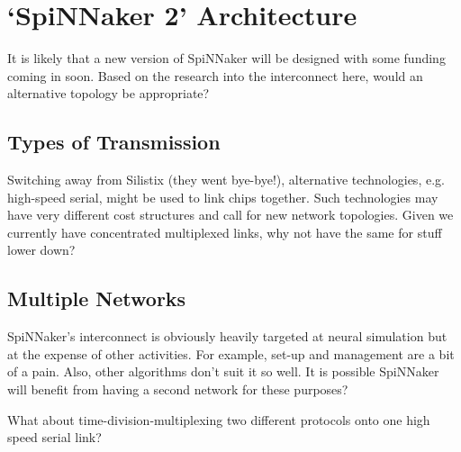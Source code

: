 	\section{`SpiNNaker 2' Architecture}
		
		It is likely that a new version of SpiNNaker will be designed with some
		funding coming in soon. Based on the research into the interconnect here,
		would an alternative topology be appropriate?
		
		\subsection{Types of Transmission}
			
			Switching away from Silistix (they went bye-bye!), alternative
			technologies, e.g. high-speed serial, might be used to link chips
			together. Such technologies may have very different cost structures and
			call for new network topologies. Given we currently have concentrated
			multiplexed links, why not have the same for stuff lower down?
		
		\subsection{Multiple Networks}
			
			SpiNNaker's interconnect is obviously heavily targeted at neural
			simulation but at the expense of other activities. For example, set-up and
			management are a bit of a pain. Also, other algorithms don't suit it so
			well. It is possible SpiNNaker will benefit from having a second network
			for these purposes?
			
			What about time-division-multiplexing two different protocols onto one
			high speed serial link?

